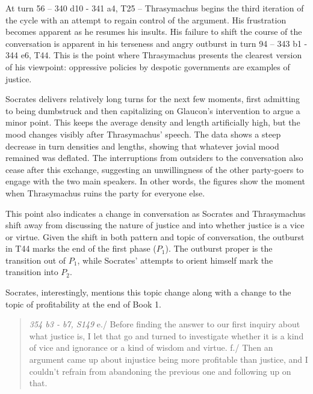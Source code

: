 \documentclass[noraggedright]{turabian-researchpaper}
\begin{document}
At turn 56 – 340 d10 - 341 a4, T25 – Thrasymachus begins the third iteration of the cycle with an attempt to regain control of the argument. His frustration becomes apparent as he resumes his insults. His failure to shift the course of the conversation is apparent in his terseness and angry outburst in turn 94 – 343 b1 - 344 e6, T44. This is the point where Thrasymachus presents the clearest version of his viewpoint: oppressive policies by despotic governments are examples of justice.

Socrates delivers relatively long turns for the next few moments, first admitting to being dumbstruck and then capitalizing on Glaucon's intervention to argue a minor point. This keeps the average density and length artificially high, but the mood changes visibly after Thrasymachus' speech. The data shows a steep decrease in turn densities and lengths, showing that whatever jovial mood remained was deflated. The interruptions from outsiders to the conversation also cease after this exchange, suggesting an unwillingness of the other party-goers to engage with the two main speakers. In other words, the figures show the moment when Thrasymachus ruins the party for everyone else.

This point also indicates a change in conversation as Socrates and Thrasymachus shift away from discussing the nature of justice and into whether justice is a vice or virtue. Given the shift in both pattern and topic of conversation, the outburst in T44 marks the end of the first phase ($P_1$). The outburst proper is the transition out of $P_1$, while Socrates' attempts to orient himself mark the transition into $P_2$.

Socrates, interestingly, mentions this topic change along with a change to the topic of profitability at the end of Book 1.

\begin{quote}
\emph{354 b3 - b7, S149} e./ Before finding the answer to our first inquiry about what justice is, I let that go and turned to investigate whether it is a kind of vice and ignorance or a kind of wisdom and virtue. f./ Then an argument came up about injustice being more profitable than justice, and I couldn't refrain from abandoning the previous one and following up on that.
\end{quote}
\end{document}
